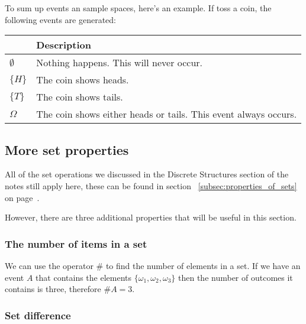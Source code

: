 
To sum up events an sample spaces, here's an example. If toss a coin, the
following events are generated:

\begin{center}
	\begin{tabular}{|>{\centering\arraybackslash}m{1cm}|m{8cm}|}
		\hline
		{\bf Event} & {\bf Description}\\ \hline
		$\emptyset$ & Nothing happens. This will never occur.\\ \hline
		$\{H\}$     & The coin shows heads.\\ \hline
		$\{T\}$     & The coin shows tails.\\ \hline
		$\Omega$    & The coin shows either heads or tails. This event always occurs.\\
		\hline
	\end{tabular}
\end{center}


\subsection{More set properties}

All of the set operations we discussed in the Discrete Structures section of the
notes still apply here, these can be found in section
~\ref{subsec:properties_of_sets} on page~\pageref{subsec:properties_of_sets}.

However, there are three additional properties that will be useful in this
section.

\subsubsection{The number of items in a set}

We can use the operator $\#$ to find the number of elements in a set. If we have
an event $A$ that contains the elements $\{\omega_1, \omega_2, \omega_3\}$ then
the number of outcomes it contains is three, therefore $\#A = 3$.

\subsubsection{Set difference}

